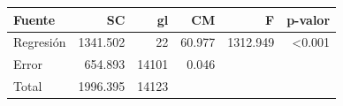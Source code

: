 \begin{tabular}{lrrrrr}
\toprule
Fuente & SC & gl & CM & F & p-valor \\
\midrule
Regresión & 1341.502 & 22 & 60.977 & 1312.949 & <0.001 \\
Error & 654.893 & 14101 & 0.046 &  &  \\
Total & 1996.395 & 14123 &  &  &  \\
\bottomrule
\end{tabular}

